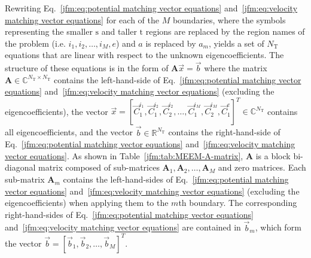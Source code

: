 Rewriting Eq.~\ref{jfm:eq:potential matching vector equations} and~\ref{jfm:eq:velocity matching vector equations} for each of the $M$ boundaries, where the symbols representing the smaller $\mathrm{s}$ and taller $\mathrm{t}$ regions are replaced by the region names of the problem (i.e. $i_1, i_2,\dots,  i_M,e$) and $a$ is replaced by $a_m$, yields a set of $N_\mathrm{T}$ equations that are linear with respect to the unknown eigencoefficients.
The structure of these equations is in the form of $\mathbf{A} \vec{x}=\vec{b}$ where the matrix $\mathbf{A} \in \mathbb{C}^{N_\mathrm{T}\times N_\mathrm{T}}$ contains the left-hand-side of Eq.~\ref{jfm:eq:potential matching vector equations} and~\ref{jfm:eq:velocity matching vector equations} (excluding the eigencoefficients), the vector $\vec{x}=[\vec{C}_{1}^{i_1}, \vec{C}_{1}^{i_2}, \vec{C}_{2}^{i_2},\dots, \vec{C}_{1}^{i_M}, \vec{C}_{2}^{i_M}, \vec{C}_{1}^{e}]^T \in \mathbb{C}^{N_\mathrm{T}}$ contains all eigencoefficients, and the vector $\vec{b} \in \mathbb{R}^{N_\mathrm{T}}$ contains the right-hand-side of Eq.~\ref{jfm:eq:potential matching vector equations} and~\ref{jfm:eq:velocity matching vector equations}.
As shown in Table~\ref{jfm:tab:MEEM-A-matrix}, $\mathbf{A}$ is a block bi-diagonal matrix composed of sub-matrices $\mathbf{A}_1,\mathbf{A}_2,\dots, \mathbf{A}_M$ and zero matrices. Each sub-matrix $\mathbf{A}_m$ contains the left-hand-sides of Eq.~\ref{jfm:eq:potential matching vector equations} and~\ref{jfm:eq:velocity matching vector equations} (excluding the eigencoefficients) when applying them to the $m$th boundary.
The corresponding right-hand-sides of Eq.~\ref{jfm:eq:potential matching vector equations} and~\ref{jfm:eq:velocity matching vector equations} are contained in $\vec{b}_m$, which form the vector $\vec{b}=[\vec{b}_1,\vec{b}_2,\dots, \vec{b}_M]^T$. 
%
